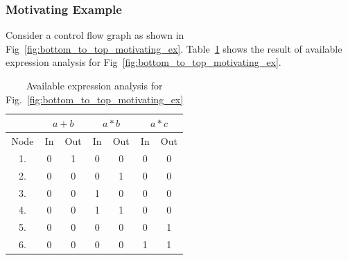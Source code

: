 \documentclass[11pt,a4paper,openright]{report}
\begin{document}
\subsubsection{Motivating Example}
Consider a control flow graph as shown in Fig~\ref{fig:bottom_to_top_motivating_ex}. Table~\ref{tab:table_available_exp_bot_to_top} shows the result of available expression 
analysis for Fig~\ref{fig:bottom_to_top_motivating_ex}.



\begin{table}[H]	
  \begin{center}
    \begin{tabular}{c c c c c c c}
    \hline
       & \multicolumn{2}{c}{$a+b$} & \multicolumn{2}{c}{$a*b$} & \multicolumn{2}{c}{$a*c$} \\
    \hline
      Node & In & Out & In & Out & In & Out\\
   	\midrule
   	  1. & 0 & 1 & 0 & 0 & 0 & 0 \\
   	  2. & 0 & 0 & 0 & 1 & 0 & 0 \\
   	  3. & 0 & 0 & 1 & 0 & 0 & 0 \\
   	  4. & 0 & 0 & 1 & 1 & 0 & 0 \\
   	  5. & 0 & 0 & 0 & 0 & 0 & 1 \\
   	  6. & 0 & 0 & 0 & 0 & 1 & 1\\
      
      \bottomrule 
    \end{tabular}
    \caption{Available expression analysis for Fig.~\ref{fig:bottom_to_top_motivating_ex}}
      \label{tab:table_available_exp_bot_to_top}
  \end{center}
\end{table}
\end{document}
